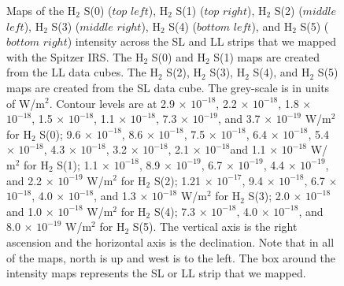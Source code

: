 \documentclass[manuscript]{aastex}
\begin{document}
\begin{figure}
\caption{Maps of the $\mathrm{H_2}$ S(0) ($top$ $left$), $\mathrm{H_2}$ S(1) ($top$ $right$), $\mathrm{H_2}$ S(2) ($middle$ $left$), $\mathrm{H_2}$ S(3) ($middle$ $right$), $\mathrm{H_2}$ S(4) ($bottom$ $left$), and $\mathrm{H_2}$ S(5) ($bottom$ $right$) intensity across the SL and LL strips that we mapped with the Spitzer IRS.  The $\mathrm{H_2}$ S(0) and $\mathrm{H_2}$ S(1) maps are created from the LL data cubes. 
The $\mathrm{H_2}$ S(2), $\mathrm{H_2}$ S(3), $\mathrm{H_2}$ S(4), and $\mathrm{H_2}$ S(5) maps are created from the SL data cube.  
The grey-scale is in units of W/$\mathrm{m^2}$.  Contour levels are at 2.9 $\times$ ${10^{-18}}$, 2.2 $\times$ ${10^{-18}}$, 1.8 $\times$ ${10^{-18}}$, 1.5 $\times$ ${10^{-18}}$, 1.1 $\times$ ${10^{-18}}$, 7.3 $\times$ ${10^{-19}}$, and 3.7 $\times$ ${10^{-19}}$ W/$\mathrm{m^2}$ for $\mathrm{H_2}$ S(0); 9.6 $\times$ ${10^{-18}}$, 8.6 $\times$ ${10^{-18}}$, 7.5 $\times$ ${10^{-18}}$, 6.4 $\times$ ${10^{-18}}$, 5.4 $\times$ ${10^{-18}}$, 4.3 $\times$ ${10^{-18}}$, 3.2 $\times$ ${10^{-18}}$, 2.1 $\times$ ${10^{-18}}$and 1.1 $\times$ ${10^{-18}}$ W/$\mathrm{m^2}$ for $\mathrm{H_2}$ S(1); 1.1 $\times$ ${10^{-18}}$, 8.9 $\times$ ${10^{-19}}$, 6.7 $\times$ ${10^{-19}}$, 4.4 $\times$ ${10^{-19}}$, and 2.2 $\times$ ${10^{-19}}$ W/$\mathrm{m^2}$ for $\mathrm{H_2}$ S(2); 1.21 $\times$ ${10^{-17}}$, 9.4 $\times$ ${10^{-18}}$, 6.7 $\times$ ${10^{-18}}$, 4.0 $\times$ ${10^{-18}}$, and 1.3 $\times$ ${10^{-18}}$ W/$\mathrm{m^2}$ for $\mathrm{H_2}$ S(3);  2.0 $\times$ ${10^{-18}}$and 1.0 $\times$ ${10^{-18}}$ W/$\mathrm{m^2}$ for $\mathrm{H_2}$ S(4); 7.3 $\times$ ${10^{-18}}$, 4.0 $\times$ ${10^{-18}}$, and 8.0 $\times$ ${10^{-19}}$ W/$\mathrm{m^2}$ for $\mathrm{H_2}$ S(5).  The vertical axis is the right ascension and the horizontal axis is the declination.  Note that in all of the maps, north is up and west is to the left.  The box around the intensity maps represents the SL or LL strip that we mapped.\label{fig1}}


\end{figure}
\clearpage
\end{document}
